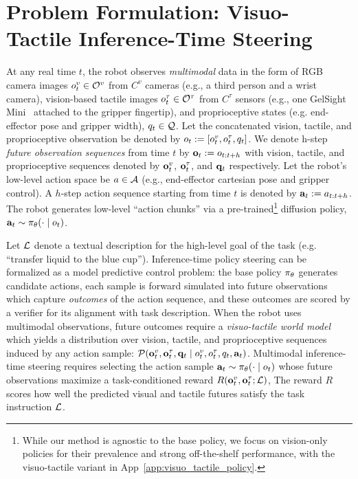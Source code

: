 \section{Problem Formulation: Visuo-Tactile Inference-Time Steering }
\label{sec:problem_formulation}

At any real time $t$, the robot observes \textit{multimodal} data in the form of RGB camera images $o^v_t \in \mathcal{O}^v$ from $C^v$ cameras (e.g., a third person and a wrist camera), vision-based tactile images $o^\tau_t \in \mathcal{O}^\tau$ from $C^\tau$ sensors (e.g., one GelSight Mini~\cite{yuan2017gelsight} attached to the gripper fingertip), and 
proprioceptive states (e.g. end-effector pose and gripper width), $q_t \in \mathcal{Q}$. 
Let the concatenated vision, tactile, and proprioceptive observation be denoted by $o_t := [o^v_t,o^\tau_t,q_t]$. 
We denote h-step \textit{future observation sequences} from time $t$ by $\mathbf{o}_t := o_{t:t+h}$ with vision, tactile, and proprioceptive sequences denoted by $\mathbf{o}^v_t$, $\mathbf{o}^\tau_t$, and $\mathbf{q}_t$ respectively.
Let the robot's low-level action space  be $a \in \mathcal{A}$  (e.g., end-effector cartesian pose and gripper control). A $h$-step action sequence starting from time $t$ is denoted by $\mathbf{a}_t := a_{t:t+h}$. 
The robot generates low-level ``action chunks'' via a pre-trained\footnote{While our method is agnostic to the base policy, we focus on vision-only policies for their prevalence and strong off-the-shelf performance, with the visuo-tactile variant in App~\ref{app:visuo_tactile_policy}.} diffusion policy, $\mathbf{a}_t \sim \pi_{\theta}(\cdot \mid o_t)$. 

 Let $\mathcal{L}$ denote a textual description for the high-level goal of the task (e.g. ``transfer liquid to the blue cup''). 
Inference-time policy steering can be formalized as a model predictive control problem: the base policy $\pi_{\theta}$ generates candidate actions, each sample is forward simulated into future observations which capture \textit{outcomes} of the action sequence, and these outcomes are scored by a verifier for its alignment with task description. 
When the robot uses multimodal observations,  future outcomes require a \textit{visuo-tactile world model} which yields a distribution over vision, tactile, and proprioceptive sequences induced by any action sample:
$\mathcal{P}(\mathbf{o}^v_t,\mathbf{o}^\tau_t,\mathbf{q}_t \mid o^v_t,o^\tau_t,q_t,\mathbf{a}_t)$.
Multimodal inference-time steering requires selecting the action sample $\mathbf{a}_t \sim \pi_{\theta}(\cdot \mid o_t)$ whose future observations maximize a task-conditioned reward $R(\mathbf{o}^v_t, \mathbf{o}^\tau_t; \mathcal{L})$, The reward $R$ scores how well the predicted visual and tactile futures satisfy the task instruction $\mathcal{L}$.


















